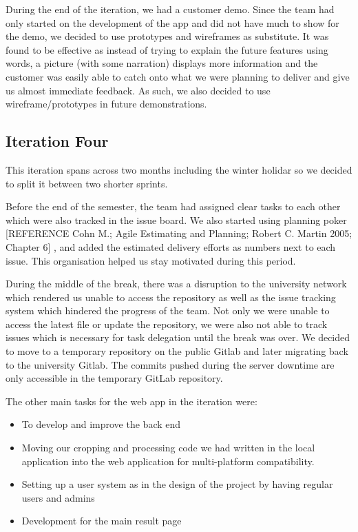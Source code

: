 \documentclass{l3proj}
\begin{document}
During the end of the iteration, we had a customer demo. Since the team had only started on the development of the app and did not have much to show for the demo, we decided to use prototypes and wireframes as substitute. It was found to be effective as instead of trying to explain the future features using words, a picture (with some narration) displays more information and the customer was easily able to catch onto what we were planning to deliver and give us almost immediate feedback. As such, we also decided to use wireframe/prototypes in future demonstrations.


\subsection{Iteration Four}

This iteration spans across two months including the winter holidar so we decided to split it between two shorter sprints. 

Before the end of the semester, the team had assigned clear tasks to each other which were also tracked in the issue board. We also started using planning poker [REFERENCE Cohn M.; Agile Estimating and Planning; Robert C. Martin 2005; Chapter 6] , and added the estimated delivery efforts as numbers next to each issue. This organisation helped us stay motivated during this period. 

During the middle of the break, there was a disruption to the university network which rendered us unable to access the repository as well as the issue tracking system which hindered the progress of the team. Not only we were unable to access the latest file or update the repository, we were also not able to track issues which is necessary for task delegation until the break was over. We decided to move to a temporary repository on the public Gitlab and later migrating back to the university Gitlab. The commits pushed during the server downtime are only accessible in the temporary GitLab repository.

The other main tasks for the web app in the iteration were:
\begin{itemize}
\item To develop and improve the back end
\item Moving our cropping and processing code we had written in the local application into the web application for multi-platform compatibility.
\item Setting up a user system as in the design of the project by having regular users and admins
\item Development for the main result page
\end{itemize}
\end{document}
